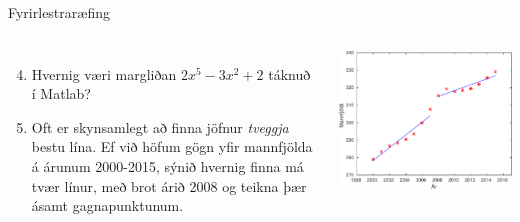 \documentclass{beamer}
\begin{document}
\begin{frame}[fragile]{Fyrirlestraræfing}
\begin{columns}
\begin{enumerate}
 \setcounter{enumi}{3}
 \item Hvernig væri margliðan $2x^5 -3x^2 +2$ táknuð í Matlab?
 \item Oft er skynsamlegt að finna jöfnur \emph{tveggja} bestu lína. Ef við höfum gögn yfir mannfjölda á árunum 2000-2015, sýnið hvernig finna má tvær línur, með brot árið 2008 og teikna þær ásamt gagnapunktunum.
\end{enumerate}
\includegraphics[width=\linewidth]{Pics/kreppa}
\end{columns}
\end{frame}

\end{document}
